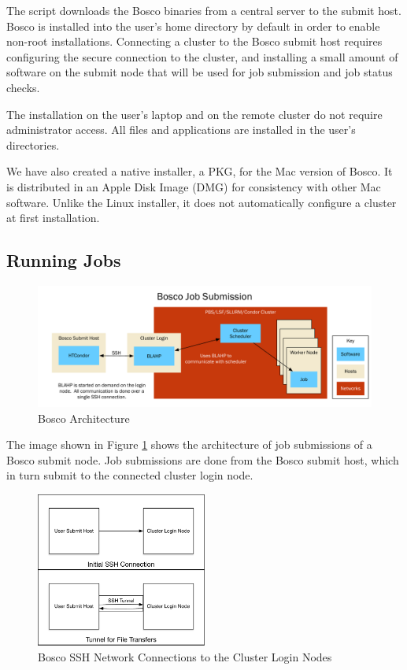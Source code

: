 The script downloads the Bosco binaries from a central server to the submit host.  Bosco is installed into the user's home directory by default in order to enable non-root installations.  Connecting a cluster to the Bosco submit host requires configuring the secure connection to the cluster, and installing a small amount of software on the submit node that will be used for job submission and job status checks.

The installation on the user's laptop and on the remote cluster do not require administrator access.  All files and applications are installed in the user's directories.

We have also created a native installer, a PKG, for the Mac version of Bosco.  It is distributed in an Apple Disk Image (DMG) for consistency with other Mac software.  Unlike the Linux installer, it does not automatically configure a cluster at first installation.


\subsection{Running Jobs}

\begin{figure}[h!t]
	\centering
	\includegraphics[width=1.3\textwidth,angle=90]{images/ArchitectureGraph1}
	\caption{Bosco Architecture}
	\label{fig:archgraph1}
\end{figure}

The image shown in Figure \ref{fig:archgraph1} shows the architecture of job submissions of a Bosco submit node.  Job submissions are done from the Bosco submit host, which in turn submit to the connected cluster login node.  


\begin{figure}[h!t]
	\centering
	\includegraphics[width=0.5\textwidth]{images/BoscoSSHNetwork.pdf}
	\caption{Bosco SSH Network Connections to the Cluster Login Nodes}
	\label{fig:boscosshnetwork}
\end{figure}

